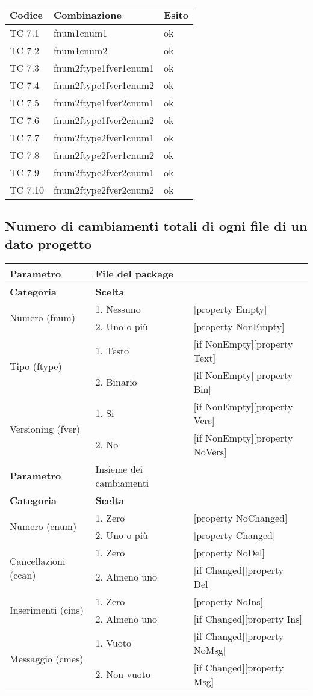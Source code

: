 \vspace{1cm}

\begin{tabular}{|p{3cm}|p{7cm}|p{3cm}|}
	\hline
	\rowcolor{Gray}
	\textbf{Codice} & \textbf{Combinazione} & \textbf{Esito}\tabularnewline
	\hline
	TC 7.1			& fnum1cnum1			& ok \tabularnewline
	\hline
	TC 7.2			& fnum1cnum2			& ok \tabularnewline
	\hline
	TC 7.3			& fnum2ftype1fver1cnum1		& ok \tabularnewline
	\hline
	TC 7.4			& fnum2ftype1fver1cnum2		& ok \tabularnewline
	\hline
	TC 7.5			& fnum2ftype1fver2cnum1		& ok \tabularnewline
	\hline
	TC 7.6			& fnum2ftype1fver2cnum2		& ok \tabularnewline
	\hline
	TC 7.7			& fnum2ftype2fver1cnum1		& ok \tabularnewline
	\hline
	TC 7.8			& fnum2ftype2fver1cnum2		& ok \tabularnewline
	\hline
	TC 7.9			& fnum2ftype2fver2cnum1		& ok \tabularnewline
	\hline
	TC 7.10			&fnum2ftype2fver2cnum2		& ok \tabularnewline
	\hline
\end{tabular}
\clearpage




\subsection{Numero di cambiamenti totali di ogni file di un dato progetto}
		
\begin{tabular}{|p{4cm}|p{4cm}p{5cm}|}
	\hline
	\cellcolor{Gray} \textbf{Parametro}		& File del package	&											\tabularnewline
	\hline
	\rowcolor{Gray}
	\textbf{Categoria} 						& \textbf{Scelta}			&									\tabularnewline
	\hline
	\multirow{2}{*}{Numero (fnum)} 			& 1. Nessuno				&	[property Empty] 				\tabularnewline
	\cline{2-3}
											& 2. Uno o più				&	[property NonEmpty]				\tabularnewline
	\hline
	\multirow{2}{*}{Tipo (ftype)} 			& 1. Testo					&	[if NonEmpty][property Text] 	\tabularnewline
	\cline{2-3}
											& 2. Binario				&	[if NonEmpty][property Bin]		\tabularnewline
	\hline
	\multirow{2}{*}{Versioning (fver)}		& 1. Si						&	[if NonEmpty][property Vers]	\tabularnewline
	\cline{2-3}
											& 2. No						&	[if NonEmpty][property NoVers]	\tabularnewline
	\hline
	
	
	\cellcolor{Gray} \textbf{Parametro}		& Insieme dei cambiamenti	&									\tabularnewline
	\hline
	\rowcolor{Gray}
	\textbf{Categoria} 						& \textbf{Scelta}			&									\tabularnewline
	\hline
	\multirow{2}{*}{Numero (cnum)} 			& 1. Zero 					&	[property NoChanged]			\tabularnewline
	\cline{2-3}
											& 2. Uno o più				&	[property Changed]				\tabularnewline
	\hline
	\multirow{2}{*}{Cancellazioni (ccan)} 	& 1. Zero	 				&	[property NoDel] 				\tabularnewline
	\cline{2-3}
											& 2. Almeno uno				&	[if Changed][property Del]		\tabularnewline
	\hline
	\multirow{2}{*}{Inserimenti (cins)} 	& 1. Zero 					&	[property NoIns] 				\tabularnewline
	\cline{2-3}
											& 2. Almeno uno 			&	[if Changed][property Ins]		\tabularnewline
	\hline
	\multirow{2}{*}{Messaggio (cmes)} 		& 1. Vuoto 					&	[if Changed][property NoMsg] 	\tabularnewline
	\cline{2-3}
											& 2. Non vuoto 				&	[if Changed][property Msg]		\tabularnewline
	\hline			
	
\end{tabular}

